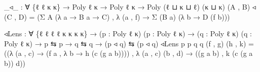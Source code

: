 \documentclass[
  11pt,
  oneside,
  article]{memoir}
\newenvironment{Shaded}{}{}
\newcommand{\NormalTok}[1]{#1}
\newcommand{\OtherTok}[1]{\textcolor[rgb]{0.00,0.44,0.13}{#1}}
\theoremstyle{definition}
\theoremstyle{plain}
\newcommand{\0}{\textsf{0}}
\newcommand{\1}{\tn{\textsf{1}}}
\begin{document}
\begin{Shaded}
\begin{Highlighting}[]
\OtherTok{\_}\NormalTok{◃}\OtherTok{\_} \OtherTok{:} \OtherTok{∀} \OtherTok{\{}\NormalTok{ℓ ℓ\textquotesingle{} κ κ\textquotesingle{}}\OtherTok{\}} \OtherTok{→}\NormalTok{ Poly ℓ κ }\OtherTok{→}\NormalTok{ Poly ℓ\textquotesingle{} κ\textquotesingle{} }\OtherTok{→}\NormalTok{ Poly }\OtherTok{(}\NormalTok{ℓ ⊔ κ ⊔ ℓ\textquotesingle{}}\OtherTok{)} \OtherTok{(}\NormalTok{κ ⊔ κ\textquotesingle{}}\OtherTok{)}
\OtherTok{(}\NormalTok{A , B}\OtherTok{)}\NormalTok{ ◃ }\OtherTok{(}\NormalTok{C , D}\OtherTok{)} \OtherTok{=} \OtherTok{(}\NormalTok{Σ A }\OtherTok{(λ}\NormalTok{ a }\OtherTok{→}\NormalTok{ B a }\OtherTok{→}\NormalTok{ C}\OtherTok{)}\NormalTok{ , }\OtherTok{λ} \OtherTok{(}\NormalTok{a , f}\OtherTok{)} \OtherTok{→}\NormalTok{ Σ }\OtherTok{(}\NormalTok{B a}\OtherTok{)} \OtherTok{(λ}\NormalTok{ b }\OtherTok{→}\NormalTok{ D }\OtherTok{(}\NormalTok{f b}\OtherTok{)))}

\NormalTok{◃Lens }\OtherTok{:} \OtherTok{∀} \OtherTok{\{}\NormalTok{ℓ ℓ\textquotesingle{} ℓ\textquotesingle{}\textquotesingle{} ℓ\textquotesingle{}\textquotesingle{}\textquotesingle{} κ κ\textquotesingle{} κ\textquotesingle{}\textquotesingle{} κ\textquotesingle{}\textquotesingle{}\textquotesingle{}}\OtherTok{\}}
        \OtherTok{→} \OtherTok{(}\NormalTok{p }\OtherTok{:}\NormalTok{ Poly ℓ κ}\OtherTok{)} \OtherTok{(}\NormalTok{p\textquotesingle{} }\OtherTok{:}\NormalTok{ Poly ℓ\textquotesingle{} κ\textquotesingle{}}\OtherTok{)} 
        \OtherTok{→} \OtherTok{(}\NormalTok{q }\OtherTok{:}\NormalTok{ Poly ℓ\textquotesingle{}\textquotesingle{} κ\textquotesingle{}\textquotesingle{}}\OtherTok{)} \OtherTok{(}\NormalTok{q\textquotesingle{} }\OtherTok{:}\NormalTok{ Poly ℓ\textquotesingle{}\textquotesingle{}\textquotesingle{} κ\textquotesingle{}\textquotesingle{}\textquotesingle{}}\OtherTok{)}
        \OtherTok{→}\NormalTok{ p ⇆ p\textquotesingle{} }\OtherTok{→}\NormalTok{ q ⇆ q\textquotesingle{} }\OtherTok{→} \OtherTok{(}\NormalTok{p ◃ q}\OtherTok{)}\NormalTok{ ⇆ }\OtherTok{(}\NormalTok{p\textquotesingle{} ◃ q\textquotesingle{}}\OtherTok{)}
\NormalTok{◃Lens p p\textquotesingle{} q q\textquotesingle{} }\OtherTok{(}\NormalTok{f , g}\OtherTok{)} \OtherTok{(}\NormalTok{h , k}\OtherTok{)} \OtherTok{=}
    \OtherTok{((λ} \OtherTok{(}\NormalTok{a , c}\OtherTok{)} \OtherTok{→} \OtherTok{(}\NormalTok{f a , }\OtherTok{λ}\NormalTok{ b\textquotesingle{} }\OtherTok{→}\NormalTok{ h }\OtherTok{(}\NormalTok{c }\OtherTok{(}\NormalTok{g a b\textquotesingle{}}\OtherTok{))))}
\NormalTok{    , }\OtherTok{λ} \OtherTok{(}\NormalTok{a , c}\OtherTok{)} \OtherTok{(}\NormalTok{b\textquotesingle{} , d\textquotesingle{}}\OtherTok{)} \OtherTok{→} \OtherTok{((}\NormalTok{g a b\textquotesingle{}}\OtherTok{)}\NormalTok{ , k }\OtherTok{(}\NormalTok{c }\OtherTok{(}\NormalTok{g a b\textquotesingle{}}\OtherTok{))}\NormalTok{ d\textquotesingle{}}\OtherTok{))}
\end{Highlighting}
\end{Shaded}
\end{document}

